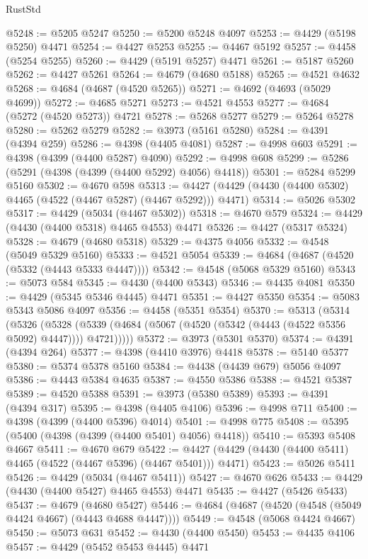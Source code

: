 \begin{lexlean}{RustStd}
\begin{coremodule}
@5248 := @5205 @5247
@5250 := @5200 @5248 @4097
@5253 := @4429 (@5198 @5250) @4471
@5254 := @4427 @5253
@5255 := @4467 @5192
@5257 := @4458 (@5254 @5255)
@5260 := @4429 (@5191 @5257) @4471
@5261 := @5187 @5260
@5262 := @4427 @5261
@5264 := @4679 (@4680 @5188)
@5265 := @4521 @4632
@5268 := @4684 (@4687 (@4520 @5265))
@5271 := @4692 (@4693 (@5029 @4699))
@5272 := @4685 @5271
@5273 := @4521 @4553
@5277 := @4684 (@5272 (@4520 @5273)) @4721
@5278 := @5268 @5277
@5279 := @5264 @5278
@5280 := @5262 @5279
@5282 := @3973 (@5161 @5280)
@5284 := @4391 (@4394 @259)
@5286 := @4398 (@4405 @4081)
@5287 := @4998 @603
@5291 := @4398 (@4399 (@4400 @5287) @4090)
@5292 := @4998 @608
@5299 := @5286 (@5291 (@4398 (@4399 (@4400 @5292) @4056) @4418))
@5301 := @5284 @5299 @5160
@5302 := @4670 @598
@5313 := @4427 (@4429 (@4430 (@4400 @5302) @4465 (@4522 (@4467 @5287) (@4467 @5292))) @4471)
@5314 := @5026 @5302
@5317 := @4429 (@5034 (@4467 @5302))
@5318 := @4670 @579
@5324 := @4429 (@4430 (@4400 @5318) @4465 @4553) @4471
@5326 := @4427 (@5317 @5324)
@5328 := @4679 (@4680 @5318)
@5329 := @4375 @4056
@5332 := @4548 (@5049 @5329 @5160)
@5333 := @4521 @5054
@5339 := @4684 (@4687 (@4520 (@5332 (@4443 @5333 @4447))))
@5342 := @4548 (@5068 @5329 @5160)
@5343 := @5073 @584
@5345 := @4430 (@4400 @5343)
@5346 := @4435 @4081
@5350 := @4429 (@5345 @5346 @4445) @4471
@5351 := @4427 @5350
@5354 := @5083 @5343 @5086 @4097
@5356 := @4458 (@5351 @5354)
@5370 := @5313
    (@5314
      (@5326
        (@5328 (@5339 (@4684 (@5067 (@4520 (@5342 (@4443 (@4522 @5356 @5092) @4447)))) @4721)))))
@5372 := @3973 (@5301 @5370)
@5374 := @4391 (@4394 @264)
@5377 := @4398 (@4410 @3976) @4418
@5378 := @5140 @5377
@5380 := @5374 @5378 @5160
@5384 := @4438 (@4439 @679) @5056 @4097
@5386 := @4443 @5384 @4635
@5387 := @4550 @5386
@5388 := @4521 @5387
@5389 := @4520 @5388
@5391 := @3973 (@5380 @5389)
@5393 := @4391 (@4394 @317)
@5395 := @4398 (@4405 @4106)
@5396 := @4998 @711
@5400 := @4398 (@4399 (@4400 @5396) @4014)
@5401 := @4998 @775
@5408 := @5395 (@5400 (@4398 (@4399 (@4400 @5401) @4056) @4418))
@5410 := @5393 @5408 @4667
@5411 := @4670 @679
@5422 := @4427 (@4429 (@4430 (@4400 @5411) @4465 (@4522 (@4467 @5396) (@4467 @5401))) @4471)
@5423 := @5026 @5411
@5426 := @4429 (@5034 (@4467 @5411))
@5427 := @4670 @626
@5433 := @4429 (@4430 (@4400 @5427) @4465 @4553) @4471
@5435 := @4427 (@5426 @5433)
@5437 := @4679 (@4680 @5427)
@5446 := @4684 (@4687 (@4520 (@4548 (@5049 @4424 @4667) (@4443 @4688 @4447))))
@5449 := @4548 (@5068 @4424 @4667)
@5450 := @5073 @631
@5452 := @4430 (@4400 @5450)
@5453 := @4435 @4106
@5457 := @4429 (@5452 @5453 @4445) @4471

\end{coremodule}
\end{lexlean}
